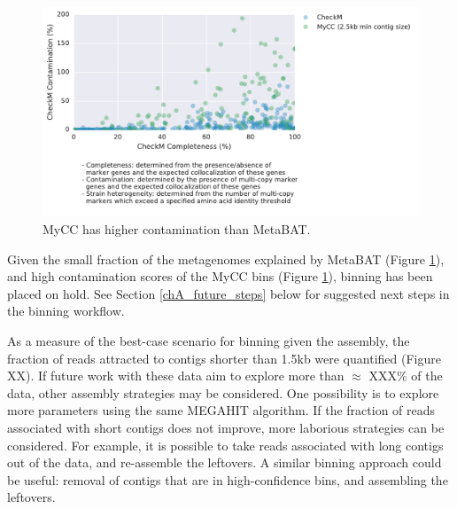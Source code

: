 \begin{figure}[H]
\centering
    \includegraphics[width=1.0\textwidth]{./tex/chapter2/figures/170202_MyCC_has_higher_contamination.pdf}
    \begin{singlespace}
    \caption[MyCC has higher contamination than MetaBAT]{
        MyCC has higher contamination than MetaBAT.}
    \label{fig:mycc_contamination}
    \end{singlespace}
\end{figure}

Given the small fraction of the metagenomes explained by MetaBAT (Figure \ref{fig:mycc_contamination}), and high contamination scores of the MyCC bins (Figure \ref{fig:mycc_contamination}), binning has been placed on hold.
See Section \ref{chA_future_steps} below for suggested next steps in the binning workflow.

As a measure of the best-case scenario for binning given the assembly, the fraction of reads attracted to contigs shorter than 1.5kb were quantified (Figure XX).
If future work with these data aim to explore more than $\approx$ XXX\% of the data, other assembly strategies may be considered.
One possibility is to explore more parameters using the same MEGAHIT algorithm.
If the fraction of reads associated with short contigs does not improve, more laborious strategies can be considered.
For example, it is possible to take reads associated with long contigs out of the data, and re-assemble the leftovers.
A similar binning approach could be useful: removal of contigs that are in high-confidence bins, and assembling the leftovers.



